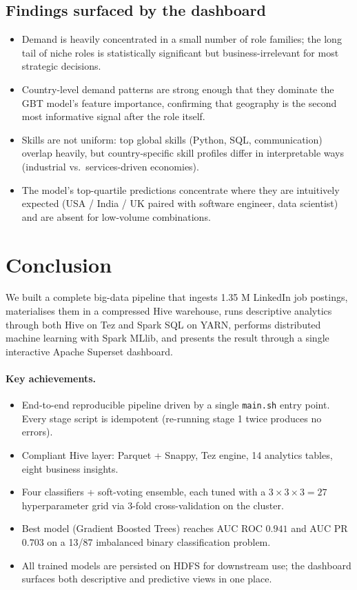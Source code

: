 \documentclass[11pt,a4paper]{article}
\begin{document}
\subsection{Findings surfaced by the dashboard}
\begin{itemize}[leftmargin=*]
  \item Demand is heavily concentrated in a small number of role
    families; the long tail of niche roles is statistically
    significant but business-irrelevant for most strategic decisions.
  \item Country-level demand patterns are strong enough that they
    dominate the GBT model's feature importance, confirming that
    geography is the second most informative signal after the role
    itself.
  \item Skills are not uniform: top global skills (Python, SQL,
    communication) overlap heavily, but country-specific skill
    profiles differ in interpretable ways (industrial vs.\
    services-driven economies).
  \item The model's top-quartile predictions concentrate where they
    are intuitively expected (USA / India / UK paired with software
    engineer, data scientist) and are absent for low-volume
    combinations.
\end{itemize}

\section{Conclusion}
\label{sec:conclusion}

We built a complete big-data pipeline that ingests 1.35 M LinkedIn
job postings, materialises them in a compressed Hive warehouse, runs
descriptive analytics through both Hive on Tez and Spark SQL on YARN,
performs distributed machine learning with Spark MLlib, and presents
the result through a single interactive Apache Superset dashboard.

\paragraph{Key achievements.}
\begin{itemize}[leftmargin=*]
  \item End-to-end reproducible pipeline driven by a single
    \texttt{main.sh} entry point.  Every stage script is idempotent
    (re-running stage 1 twice produces no errors).
  \item Compliant Hive layer: Parquet + Snappy, Tez engine, 14
    analytics tables, eight business insights.
  \item Four classifiers + soft-voting ensemble, each tuned with a
    $3 \times 3 \times 3 = 27$ hyperparameter grid via 3-fold
    cross-validation on the cluster.
  \item Best model (Gradient Boosted Trees) reaches AUC ROC
    $\mathbf{0.941}$ and AUC PR $\mathbf{0.703}$ on a 13/87
    imbalanced binary classification problem.
  \item All trained models are persisted on HDFS for downstream use;
    the dashboard surfaces both descriptive and predictive views in
    one place.
\end{itemize}
\end{document}
